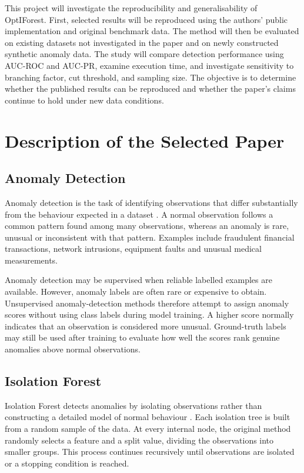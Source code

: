 \documentclass[11pt]{article}
\begin{document}
This project will investigate the reproducibility and generalisability
of OptIForest. First, selected results will be reproduced using the
authors' public implementation and original benchmark data. The method
will then be evaluated on existing datasets not investigated in the
paper and on newly constructed synthetic anomaly data. The study will
compare detection performance using AUC-ROC and AUC-PR, examine
execution time, and investigate sensitivity to branching factor, cut
threshold, and sampling size. The objective is to determine whether the
published results can be reproduced and whether the paper's claims
continue to hold under new data conditions.

\section{Description of the Selected Paper}

\subsection{Anomaly Detection}
Anomaly detection is the task of identifying observations that differ
substantially from the behaviour expected in a dataset
\citep{chandola2009anomaly}. A normal observation follows a common
pattern found among many observations, whereas an anomaly is rare,
unusual or inconsistent with that pattern. Examples include fraudulent
financial transactions, network intrusions, equipment faults and unusual
medical measurements.

Anomaly detection may be supervised when reliable labelled examples are
available. However, anomaly labels are often rare or expensive to obtain.
Unsupervised anomaly-detection methods therefore attempt to assign
anomaly scores without using class labels during model training. A higher
score normally indicates that an observation is considered more unusual.
Ground-truth labels may still be used after training to evaluate how well
the scores rank genuine anomalies above normal observations.

\subsection{Isolation Forest}
Isolation Forest detects anomalies by isolating observations rather
than constructing a detailed model of normal behaviour
\citep{liu2008isolation}. Each isolation tree is built from a random
sample of the data. At every internal node, the original method randomly
selects a feature and a split value, dividing the observations into
smaller groups. This process continues recursively until observations
are isolated or a stopping condition is reached.
\end{document}
